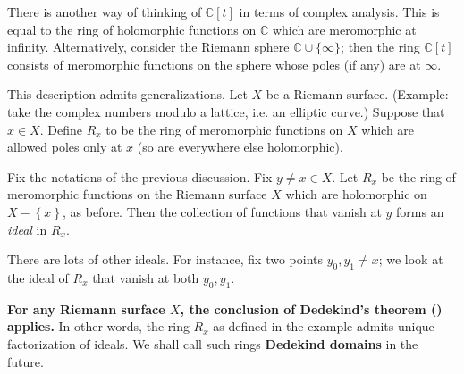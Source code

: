 There is another way of thinking of $\mathbb{C}[t]$ in terms of complex
analysis.  This is equal to the ring of holomorphic functions on $\mathbb{C}$
which are meromorphic at infinity.  
Alternatively, consider the Riemann sphere $\mathbb{C} \cup \{ \infty\}$; then the ring $\mathbb{C}[t]$
consists of meromorphic functions on the sphere whose poles (if any) are at
$\infty$. 

This description admits generalizations. 
Let $X$ be a
Riemann surface.  (Example: take the complex numbers modulo a lattice, i.e. an
elliptic curve.)
Suppose that $x \in X$. Define $R_x$ to be the ring of meromorphic functions on $X$
which are allowed poles only at $x$ (so are everywhere else holomorphic). 

\begin{example} Fix the notations of the previous discussion. 
Fix $y \neq x \in X$. Let $R_x$ be the ring of meromorphic functions on the
Riemann surface $X$ which are holomorphic on $X - \left\{x\right\}$, as before.
Then the collection of functions that vanish at $y$ forms an
\emph{ideal} in $R_x$. 

There are lots of other ideals. For instance, fix two
points $y_0, y_1 \neq x$; we look at the ideal of $R_x$ that vanish at both $y_0, y_1$.

\end{example} 


\textbf{For any Riemann surface $X$, the conclusion of Dedekind's theorem
() applies.  } In other
words, the ring  $R_x$ as defined in the example admits  unique factorization of
ideals. We shall call such rings \textbf{Dedekind domains} in the future.

